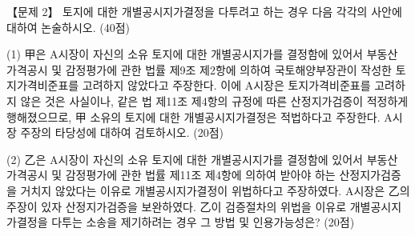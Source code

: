 \begin{longquestion}{【문제 2】}
토지에 대한 개별공시지가결정을 다투려고 하는 경우 다음 각각의 사안에 대하여 논술하시오. (40점) \par
\medskip\noindent (1) 甲은 A시장이 자신의 소유 토지에 대한 개별공시지가를 결정함에 있어서 부동산 가격공시 및 감정평가에 관한 법률 제9조 제2항에 의하여 국토해양부장관이 작성한 토지가격비준표를 고려하지 않았다고 주장한다. 이에 A시장은 토지가격비준표를 고려하지 않은 것은 사실이나, 같은 법 제11조 제4항의 규정에 따른 산정지가검증이 적정하게 행해졌으므로, 甲 소유의 토지에 대한 개별공시지가결정은 적법하다고 주장한다. A시장 주장의 타당성에 대하여 검토하시오. (20점) \par
\medskip\noindent (2) 乙은 A시장이 자신의 소유 토지에 대한 개별공시지가를 결정함에 있어서 부동산 가격공시 및 감정평가에 관한 법률 제11조 제4항에 의하여 받아야 하는 산정지가검증을 거치지 않았다는 이유로 개별공시지가결정이 위법하다고 주장하였다. A시장은 乙의 주장이 있자 산정지가검증을 보완하였다. 乙이 검증절차의 위법을 이유로 개별공시지가결정을 다투는 소송을 제기하려는 경우 그 방법 및 인용가능성은? (20점) \par
\end{longquestion}
